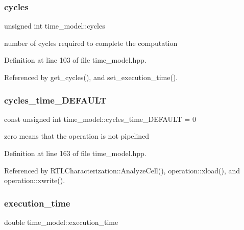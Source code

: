 \subsubsection{\texorpdfstring{cycles}{cycles}}
{\footnotesize\ttfamily unsigned int time\+\_\+model\+::cycles\hspace{0.3cm}{\ttfamily [protected]}}



number of cycles required to complete the computation 



Definition at line 103 of file time\+\_\+model.\+hpp.



Referenced by get\+\_\+cycles(), and set\+\_\+execution\+\_\+time().

\mbox{\label{classtime__model_ae61b7de7c0f11fb728ecd5b2f4766121}} 
\subsubsection{\texorpdfstring{cycles\+\_\+time\+\_\+\+D\+E\+F\+A\+U\+LT}{cycles\_time\_DEFAULT}}
{\footnotesize\ttfamily const unsigned int time\+\_\+model\+::cycles\+\_\+time\+\_\+\+D\+E\+F\+A\+U\+LT = 0\hspace{0.3cm}{\ttfamily [static]}}



zero means that the operation is not pipelined 



Definition at line 163 of file time\+\_\+model.\+hpp.



Referenced by R\+T\+L\+Characterization\+::\+Analyze\+Cell(), operation\+::xload(), and operation\+::xwrite().

\mbox{\label{classtime__model_a7b02cefe3b48c07b9bf06e70e1333afa}} 
\subsubsection{\texorpdfstring{execution\+\_\+time}{execution\_time}}
{\footnotesize\ttfamily double time\+\_\+model\+::execution\+\_\+time\hspace{0.3cm}{\ttfamily [protected]}}



